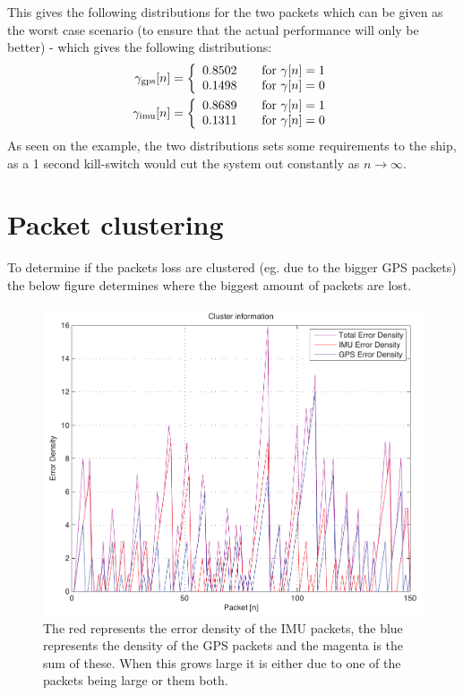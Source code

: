 This gives the following distributions for the two packets which can be given as the worst case scenario (to ensure that the actual performance will only be better) - which gives the following distributions:
\begin{align}
\gamma_\text{gps}[n] = 
\left\{ 
  \begin{array}{l l}
    0.8502 & \quad \text{for}\,\, \gamma[n] = 1\\
    0.1498 & \quad \text{for}\,\, \gamma[n] = 0
  \end{array} \right.\\
  \gamma_\text{imu}[n] = 
\left\{ 
  \begin{array}{l l}
    0.8689 & \quad \text{for}\,\, \gamma[n] = 1\\
    0.1311 & \quad \text{for}\,\, \gamma[n] = 0
  \end{array} \right.
\end{align}
As seen on the example, the two distributions sets some requirements to the ship, as a 1 second kill-switch would cut the system out constantly as $n \to \infty$. 

\section{Packet clustering}
To determine if the packets loss are clustered (eg. due to the bigger GPS packets) the below figure determines where the biggest amount of packets are lost. 

\begin{figure}[htbp]
		\begin{center}
			\includegraphics[width=\textwidth]{img/cluster}
			\caption{The red represents the error density of the IMU packets, the blue represents the density of the GPS packets and the magenta is the sum of these. When this grows large it is either due to one of the packets being large or them both. }
			\label{fig:cluster}
		\end{center}
\end{figure}

